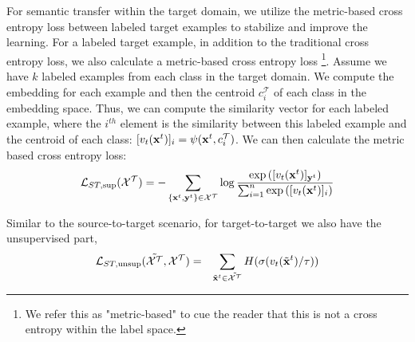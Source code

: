 


For semantic transfer within the target domain, we utilize the metric-based cross entropy loss between labeled target examples to stabilize and improve the learning. For a labeled target example, in addition to the traditional cross entropy loss, we also calculate a metric-based cross entropy loss \footnote{We refer this as "metric-based" to cue the reader that this is not a cross entropy within the label space.}. Assume we have $k$ labeled examples from each class in the target domain. We compute the embedding for each example and then the centroid $c_i^{\mathcal{T}}$ of each class in the embedding space. Thus, we can compute the similarity vector for each labeled example, where the $i^{th}$ element is the similarity between this labeled example and the centroid of each class: $[v_t(\mathbf{x}^{t})]_i = \psi(\mathbf{x}^{t}, c_i^{\mathcal{T}})$. We can then calculate the metric based cross entropy loss:
\begin{equation} \label{eq:6}
\mathcal{L}_{ST, \text{sup}}(\mathcal{X}^{\mathcal{T}}) = -\sum_{\{\mathbf{x}^{t}, \mathbf{y}^{t}\} \in \mathcal{X}^{\mathcal{T}}} \log \frac{\exp\left([v_t(\mathbf{x}^{t})]_{\mathbf{y}^{t}}\right)}{\sum_{i=1}^{n}\exp\left([v_t(\mathbf{x}^{t})]_{i}\right)}
\end{equation}

Similar to the source-to-target scenario, for target-to-target we also have the unsupervised part,
\begin{eqnarray} \label{eq:7}
\mathcal{L}_{ST, \text{unsup}}(\tilde{\mathcal{X}^{\mathcal{T}}}, \mathcal{X}^{\mathcal{T}}) &=& \sum_{\tilde{\mathbf{x}}^{t}\in\tilde{\mathcal{X}^{\mathcal{T}}}} H(\sigma(v_t(\tilde{\mathbf{x}}^{t})/ \tau))
\end{eqnarray}

